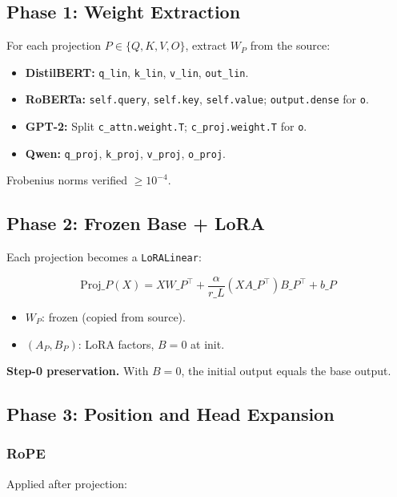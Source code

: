 \subsection{Phase 1: Weight Extraction}

For each projection $P \in \{Q, K, V, O\}$, extract $W_P$ from the source:

\begin{itemize}
\item \textbf{DistilBERT:} \texttt{q\_lin}, \texttt{k\_lin}, \texttt{v\_lin}, \texttt{out\_lin}.
\item \textbf{RoBERTa:} \texttt{self.query}, \texttt{self.key}, \texttt{self.value}; \texttt{output.dense} for \texttt{o}.
\item \textbf{GPT-2:} Split \texttt{c\_attn.weight.T}; \texttt{c\_proj.weight.T} for \texttt{o}.
\item \textbf{Qwen:} \texttt{q\_proj}, \texttt{k\_proj}, \texttt{v\_proj}, \texttt{o\_proj}.

\end{itemize}
Frobenius norms verified $\geq 10^{-4}$.

\subsection{Phase 2: Frozen Base + LoRA}

Each projection becomes a \texttt{LoRALinear}:

\[
\text{Proj}\_P(X) = X W\_P^\top + \frac{\alpha}{r\_L} (X A\_P^\top) B\_P^\top + b\_P
\tag{4.1}
\]

\begin{itemize}
\item $W_P$: frozen (copied from source).
\item $(A_P, B_P)$: LoRA factors, $B = 0$ at init.

\end{itemize}
\textbf{Step-0 preservation.} With $B = 0$, the initial output equals the base 
output.

\subsection{Phase 3: Position and Head Expansion}

\subsubsection{RoPE}

Applied after projection:

